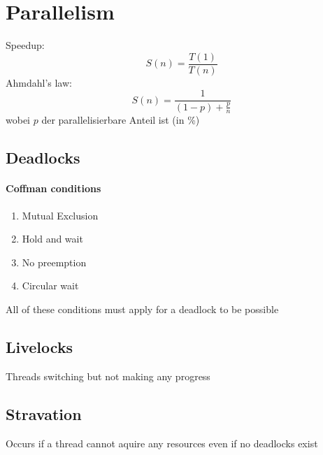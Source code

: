 \section{Parallelism}
Speedup:
$$S(n) = \frac{T(1)}{T(n)}$$
Ahmdahl's law:
$$ S(n) = \frac{1}{(1 - p)+\frac{p}{n}}$$
wobei $p$ der parallelisierbare Anteil ist (in \%)
\subsection{Deadlocks}
\paragraph{Coffman conditions}
\begin{enumerate}
	\item Mutual Exclusion
	\item Hold and wait
	\item No preemption
	\item Circular wait
\end{enumerate}
All of these conditions must apply for a deadlock to be possible
\subsection{Livelocks}
Threads switching but not making any progress
\subsection{Stravation}
Occurs if a thread cannot aquire any resources even if no deadlocks exist
